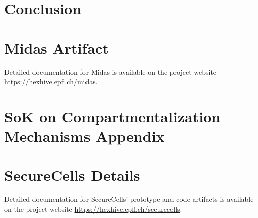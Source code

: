 \documentclass[lablogo]{thesis}
\newcommand{\seccells}{SecureCells\xspace}
\newcommand{\midas}{Midas\xspace}
\begin{document}
\chapter{Conclusion}
\label{ch:conclusion}


\begin{appendices}
\chapter{\midas Artifact}

Detailed documentation for \midas is available on the project website 
\url{https://hexhive.epfl.ch/midas}.


\chapter{SoK on Compartmentalization Mechanisms Appendix}


\chapter{\seccells Details}

Detailed documentation for \seccells{}' prototype and code artifacts is
available on the project website \url{https://hexhive.epfl.ch/securecells}.


\end{appendices}

\backmatter

{}
\printbibliography
\end{document}

